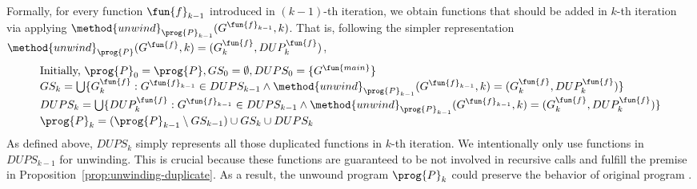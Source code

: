 Formally, for every function $\fun{f}_{k-1}$ introduced in $(k-1)$-th iteration,
we obtain functions that should be added in $k$-th iteration via applying
$\method{unwind}_{\prog{P}_{k-1}}(G^{\fun{f}_{k-1}}, k)$.
That is, following the simpler representation
$\method{unwind}_\prog{P}(G^\fun{f}, k) = (G^\fun{f}_k, DUP^\fun{f}_k)$,
\[
\begin{array}{l}
\text{Initially, } \prog{P}_0 = \prog{P}, GS_0 = \emptyset,DUPS_0 = \{G^\fun{main}\} \\
GS_k = \bigcup\{G^\fun{f}_k : G^{\fun{f}_{k-1}} \in DUPS_{k-1}
  \land \method{unwind}_{\prog{P}_{k-1}}(G^{\fun{f}_{k-1}}, k) = (G^\fun{f}_k, DUP^\fun{f}_k)
  \} \\
DUPS_k = \bigcup\{
  DUP^\fun{f}_k : G^{\fun{f}_{k-1}} \in DUPS_{k-1}
  \land \method{unwind}_{\prog{P}_{k-1}}(G^{\fun{f}_{k-1}}, k) = (G^\fun{f}_k, DUP^\fun{f}_k)
  \} \\
\prog{P}_k = (\prog{P}_{k-1} \setminus GS_{k-1}) \cup GS_k \cup DUPS_k\\
\end{array}
\]
As defined above, $DUPS_k$ simply represents all those duplicated functions in
$k$-th iteration.
We intentionally only use functions in $DUPS_{k-1}$ for unwinding.
This is crucial because these functions are guaranteed to be not involved in
recursive calls and fulfill the premise in
Proposition~\ref{prop:unwinding-duplicate}.
As a result, the unwound program $\prog{P}_k$ could preserve the behavior of
original program .

